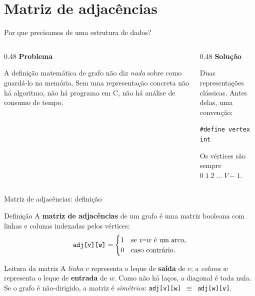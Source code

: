 \documentclass[aspectratio=169]{beamer}
\begin{document}
\section{Matriz de adjacências}

\begin{frame}[fragile]{Por que precisamos de uma estrutura de dados?}
  \begin{columns}[T]
    \begin{column}{0.48\textwidth}
      \textbf{Problema}

      \medskip
      {\small A definição matemática de grafo não diz \emph{nada} sobre como
      guardá-lo na memória. Sem uma representação concreta não há algoritmo,
      não há programa em C, não há análise de consumo de tempo.}
    \end{column}
    \begin{column}{0.48\textwidth}
      \textbf{Solução}

      \medskip
      {\small Duas representações clássicas. Antes delas, uma convenção:

      \smallskip
      \lstinline|#define vertex int|

      \smallskip
      Os vértices são sempre $0\;1\;2\;\ldots\;V-1$.}
    \end{column}
  \end{columns}
\end{frame}

\begin{frame}{Matriz de adjacências: definição}
  \begin{block}{Definição}
    {\small A \textbf{matriz de adjacências} de um grafo é uma matriz booleana
    com linhas e colunas indexadas pelos vértices:
    \[
      \texttt{adj[v][w]} =
      \begin{cases}
        1 & \text{se } v\text{\texttt{-}}w \text{ é um arco},\\
        0 & \text{caso contrário.}
      \end{cases}
    \]}
  \end{block}
  \begin{exampleblock}{Leitura da matriz}
    {\small A \emph{linha} $v$ representa o leque de \textbf{saída} de $v$;
    a \emph{coluna} $w$ representa o leque de \textbf{entrada} de $w$.
    Como não há laços, a diagonal é toda nula. Se o grafo é não-dirigido,
    a matriz é \emph{simétrica}: \texttt{adj[v][w] $\equiv$ adj[w][v]}.}
  \end{exampleblock}
\end{frame}
\end{document}
